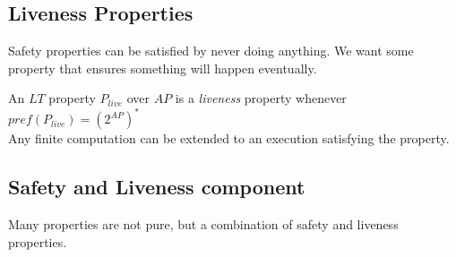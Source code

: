 \documentclass[a4paper, 10pt]{article}
\begin{document}
\subsection*{Liveness Properties}
Safety properties can be satisfied by never doing anything. \follows We want some property that ensures something will happen eventually.
\begin{shaded}
    An $LT$ property $P_{live}$ over $AP$ is a \emph{liveness} property whenever $pref(P_{live})=(2^{AP})^*$ \\
    {\tiny \follows Any finite computation can be extended to an execution satisfying the property.}
\end{shaded}

\subsection*{Safety and Liveness component}
Many properties are not pure, but a combination of safety and liveness properties.
\end{document}
